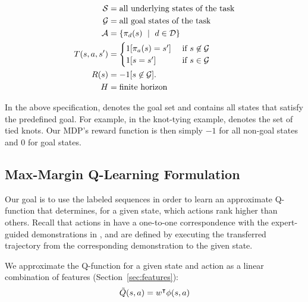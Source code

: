 \begin{equation}
\begin{aligned}
\stateset{} &=  \text{all underlying states of the task} \\
\goalset{} &=  \text{all goal states of the task} \\
\actionset{} &= \{\policysub{\demovar{}}{\statevar{}}\ \mid \text{ } \demovar{} \in \demoset{}\} \\
\transitionfn{}(\statevar{}, \actionvar{}, \nextstatevar{}) &=
    \begin{cases}
    1[\policysub{\actionvar{}}{\statevar{}} = \nextstatevar{}] &\text{ if } \statevar{} \not \in \goalset{} \\
    1[\statevar{} = \statevar{}'] &\text{ if } \statevar{} \in \goalset{}
    \end{cases}\\
\rewardfn{}(\statevar{}) &= -1 {[ \statevar{} \not \in \goalset{} ]}. \\
H &= \text{finite horizon}
\end{aligned}
\label{eq:mdp}
\end{equation}

In the above specification, \goalset{} denotes the goal set and contains all
states that satisfy the predefined goal. For example, in the knot-tying example,
\goalset{} denotes the set of tied knots.  Our MDP's reward function is then
simply $-1$ for all non-goal states and $0$ for goal states.

\subsection{Max-Margin Q-Learning Formulation}
Our goal is to use the labeled sequences  in order to learn an
approximate Q-function that determines, for a given state, which actions
rank higher than others.
Recall that actions in \actionset{} have a one-to-one correspondence with the
expert-guided demonstrations in \demoset{}, and are defined by executing the
transferred trajectory from the corresponding demonstration to the given state.

We approximate the Q-function for a given state \statevar{} and action
\actionvar{} as a linear combination of features \features{\statevar{}}{\actionvar{}}
(Section~\ref{sec:features}):
\begin{equation}
\tilde{Q}(s{}, a{}) = w^\intercal{} \phi({s{}}, {a{}})
\end{equation}

